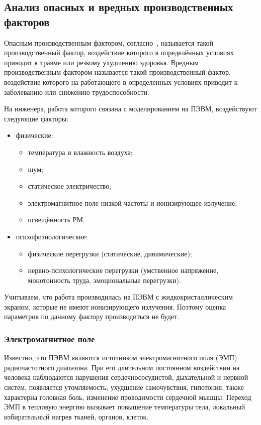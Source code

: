 \subsection{Анализ опасных и вредных производственных факторов}

Опасным производственным фактором, согласно~\cite{Dahf2016}, называется такой производственный фактор, воздействие которого в определённых условиях приводит к травме или резкому ухудшению здоровья.
Вредным производственным фактором называется такой производственный фактор, воздействие которого на работающего в определенных условиях приводит к заболеванию или снижению трудоспособности.

На инженера, работа которого связана с моделированием на ПЭВМ, воздействуют следующие факторы:

\begin{itemize}
    \item физические:
    \begin{itemize}[leftmargin=+]
        \item температура и влажность воздуха;
        \item шум;
        \item статическое электричество;
        \item электромагнитное поле низкой частоты и ионизирующее излучение;
        \item освещённость РМ.
    \end{itemize}
    \item психофизиологические:
    \begin{itemize}[leftmargin=+]
        \item физические перегрузки (статические, динамические);
        \item нервно-психологические перегрузки (умственное напряжение, монотонность труда, эмоциональные перегрузки).
    \end{itemize}
\end{itemize}

Учитываем, что работа производилась на ПЭВМ с жидкокристаллическим экраном, которые не имеют ионизирующего излучения. 
Поэтому оценка параметров по данному фактору производиться не будет.


\subsubsection{Электромагнитное поле}

Известно, что ПЭВМ являются источником электромагнитного поля (ЭМП) радиочастотного диапазона. 
При его длительном постоянном воздействии на человека наблюдаются нарушения сердечнососудистой, дыхательной и нервной систем, появляется утомляемость, ухудшение самочувствия, гипотония, также характерна головная боль, изменение проводимости сердечной мышцы. 
Переход ЭМП в тепловую энергию вызывает повышение температуры тела, локальный избирательный нагрев тканей, органов, клеток.

